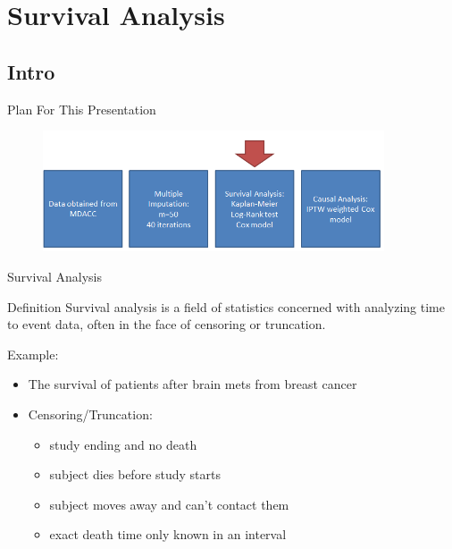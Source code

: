 \section{Survival Analysis}

\subsection{Intro}

\begin{frame}{Plan For This Presentation}
  \begin{figure}[h!]
  \centering
    \includegraphics[width=0.9\textwidth]{surv_flow}
\label{fig:surv_flow}
\end{figure} 
\end{frame}

\begin{frame}{Survival Analysis}
\begin{block}{Definition}
Survival analysis is a field of statistics concerned with analyzing time to 
event data, often in the face of censoring or truncation.
\end{block}
Example:
\begin{itemize}
 \item The survival of patients after brain mets from breast cancer
 \item Censoring/Truncation:
 \begin{itemize}
  \item study ending and no death 
  \item subject dies before study starts
  \item subject moves away and can't contact them 
 \item exact death time only known in an interval
 \end{itemize}

\end{itemize}
\end{frame}

